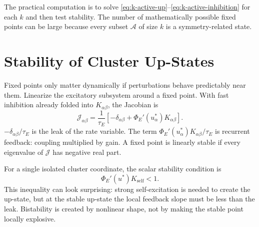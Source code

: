The practical computation is to solve \eqref{eq:k-active-up}--\eqref{eq:k-active-inhibition} for each $k$ and then test stability. The number of mathematically possible fixed points can be large because every subset $\mathcal{A}$ of size $k$ is a symmetry-related state.

\section{Stability of Cluster Up-States}
\label{sec:stability-of-cluster-upstates}

Fixed points only matter dynamically if perturbations behave predictably near them. Linearize the excitatory subsystem around a fixed point. With fast inhibition already folded into $K_{\alpha\beta}$, the Jacobian is
%
\begin{equation}
  \mathcal{J}_{\alpha\beta}
  =
  \frac{1}{\tau_E}
  \left[
    -\delta_{\alpha\beta}
    +
    \Phi_E'(u_{\alpha}^*)K_{\alpha\beta}
  \right].
  \label{eq:e-cluster-jacobian}
\end{equation}
%
$-\delta_{\alpha\beta}/\tau_E$ is the leak of the rate variable. The term $\Phi_E'(u_{\alpha}^*)K_{\alpha\beta}/\tau_E$ is recurrent feedback: coupling multiplied by gain. A fixed point is linearly stable if every eigenvalue of $\mathcal{J}$ has negative real part.

For a single isolated cluster coordinate, the scalar stability condition is
%
\begin{equation}
  \Phi_E'(u^*)K_{\mathrm{self}} < 1 .
  \label{eq:scalar-upstate-stability}
\end{equation}
%
This inequality can look surprising: strong self-excitation is needed to create the up-state, but at the stable up-state the local feedback slope must be less than the leak. Bistability is created by nonlinear shape, not by making the stable point locally explosive.

